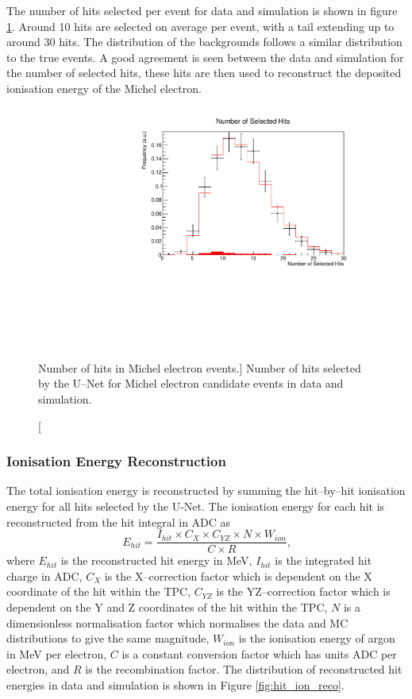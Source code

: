 The number of hits selected per event for data and simulation is shown in 
figure \ref{fig:mich_n_hits}. Around 10 hits are selected on average per 
event, with a tail extending up to around 30 hits. The distribution of the
backgrounds follows a similar distribution to the true events. A good agreement
is seen between the data and simulation for the number of selected hits, these
hits are then used to reconstruct the deposited ionisation energy of the Michel
electron.
\begin{figure}
	\centering
	\includegraphics[width=\textwidth]{figures/mich_n_hits.pdf}
	\caption
	[Number of hits in Michel electron events.]
	{Number of hits selected by the U--Net for Michel electron candidate events in
	data and simulation.}
	\label{fig:mich_n_hits}
\end{figure}

\subsubsection{Ionisation Energy Reconstruction}

The total ionisation energy is reconstructed by summing the hit--by--hit
ionisation energy for all hits selected by the U-Net. The ionisation energy for
each hit is reconstructed from the hit integral in ADC as 
\begin{equation}
	E_{hit} = \frac{I_{hit} \times C_X \times C_{YZ} \times N \times W_{ion}}{C \times R}\mbox{,}
\end{equation}
where $E_{hit}$ is the reconstructed hit energy in MeV, $I_{hit}$ is the
integrated hit charge in ADC, $C_X$ is the X--correction factor which is
dependent on the X coordinate of the hit within the TPC, $C_{YZ}$ is the 
YZ--correction factor which is dependent on the Y and Z coordinates 
of the hit within the TPC, $N$ is a dimensionless normalisation factor which
normalises the data and MC distributions to give the same magnitude, $W_{ion}$
is the ionisation energy of argon in MeV per electron, $C$ is a constant
conversion factor which has units ADC per electron, and $R$ is the
recombination factor. The distribution of reconstructed hit energies in
\protodune{} data and simulation is shown in Figure \ref{fig:hit_ion_reco}.

